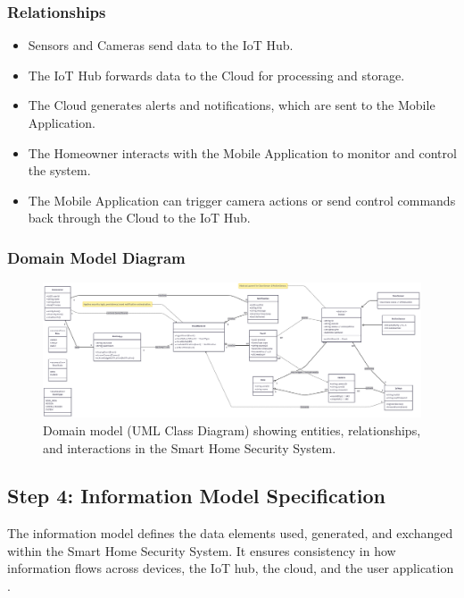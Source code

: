 \documentclass[conference]{IEEEtran}
\begin{document}
\subsubsection{Relationships}
\begin{itemize}
    \item Sensors and Cameras send data to the IoT Hub.
    \item The IoT Hub forwards data to the Cloud for processing and storage.
    \item The Cloud generates alerts and notifications, which are sent to the Mobile Application.
    \item The Homeowner interacts with the Mobile Application to monitor and control the system.
    \item The Mobile Application can trigger camera actions or send control commands back through the Cloud to the IoT Hub.
\end{itemize}

\subsubsection{Domain Model Diagram}
\begin{figure}[htbp]
\centerline{\includegraphics[width=0.9\columnwidth]{domain_model.png}}
\caption{Domain model (UML Class Diagram) showing entities, relationships, and interactions in the Smart Home Security System.}
\label{fig:domain-model}
\end{figure}



\subsection{Step 4: Information Model Specification}
The information model defines the data elements used, generated, and exchanged within the Smart Home Security System. It ensures consistency in how information flows across devices, the IoT hub, the cloud, and the user application \cite{wang_iot_devices_security_2024, article_S266729522100026X}.
\end{document}
